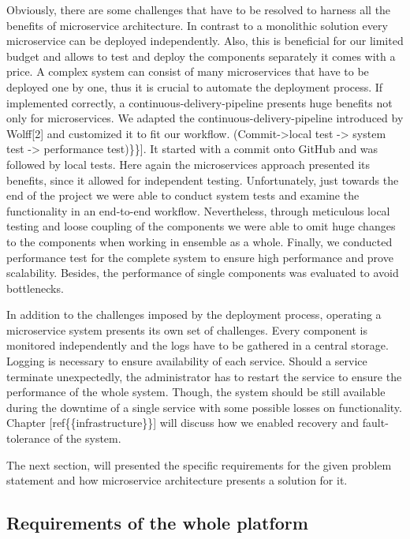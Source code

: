 Obviously, there are some challenges that have to be resolved to harness
all the benefits of microservice architecture. In contrast to a
monolithic solution every microservice can be deployed independently.
Also, this is beneficial for our limited budget and allows to test and
deploy the components separately it comes with a price. A complex system
can consist of many microservices that have to be deployed one by one,
thus it is crucial to automate the deployment process. If implemented
correctly, a continuous-delivery-pipeline presents huge benefits not
only for microservices. We adapted the continuous-delivery-pipeline
introduced by Wolff{[}2{]} and customized it to fit our workflow.
(Commit-\textgreater{}local test -\textgreater{} system test
-\textgreater{} performance test)\}\}{]}. It started with a commit onto
GitHub and was followed by local tests. Here again the microservices
approach presented its benefits, since it allowed for independent
testing. Unfortunately, just towards the end of the project we were able
to conduct system tests and examine the functionality in an end-to-end
workflow. Nevertheless, through meticulous local testing and loose
coupling of the components we were able to omit huge changes to the
components when working in ensemble as a whole. Finally, we conducted
performance test for the complete system to ensure high performance and
prove scalability. Besides, the performance of single components was
evaluated to avoid bottlenecks.

In addition to the challenges imposed by the deployment process,
operating a microservice system presents its own set of challenges.
Every component is monitored independently and the logs have to be
gathered in a central storage. Logging is necessary to ensure
availability of each service. Should a service terminate unexpectedly,
the administrator has to restart the service to ensure the performance
of the whole system. Though, the system should be still available during
the downtime of a single service with some possible losses on
functionality. Chapter {[}ref\{\{infrastructure\}\}{]} will discuss how
we enabled recovery and fault-tolerance of the system.

The next section, will presented the specific requirements for the given
problem statement and how microservice architecture presents a solution
for it.

\subsection{Requirements of the whole
platform}\label{requirements-of-the-whole-platform}

